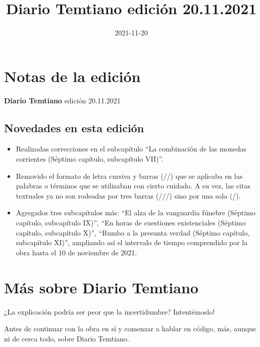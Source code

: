 \documentclass[
  spanish,
]{book}
\title{Diario Temtiano edición 20.11.2021}
\author{}
\date{\vspace{-2.5em}2021-11-20}
\begin{document}
\maketitle

{
\setcounter{tocdepth}{1}
\tableofcontents
}
\hypertarget{notas-de-la-ediciuxf3n}{%
\chapter*{Notas de la edición}\label{notas-de-la-ediciuxf3n}}

\textbf{Diario Temtiano} edición 20.11.2021

\hypertarget{novedades-en-esta-ediciuxf3n}{%
\section*{Novedades en esta edición}\label{novedades-en-esta-ediciuxf3n}}

\begin{itemize}
\item
  Realizadas correcciones en el subcapítulo ``La combinación de las monedas corrientes (Séptimo capítulo, subcapítulo VII)''.
\item
  Removido el formato de letra cursiva y barras (//) que se aplicaba en las palabras o términos que se utilizaban con cierto cuidado. A su vez, las citas textuales ya no son rodeadas por tres barras (///) sino por una sola (/).
\item
  Agregados tres subcapítulos más: ``El alza de la vanguardia fúnebre (Séptimo capítulo, subcapítulo IX)'', ``En horas de cuestiones existenciales (Séptimo capítulo, subcapítulo X)'', ``Rumbo a la presunta verdad (Séptimo capítulo, subcapítulo XI)'', ampliando así el intervalo de tiempo comprendido por la obra hasta el 10 de noviembre de 2021.
\end{itemize}

\hypertarget{muxe1s-sobre-diario-temtiano}{%
\chapter*{Más sobre Diario Temtiano}\label{muxe1s-sobre-diario-temtiano}}

¿La explicación podría ser peor que la incertidumbre? Intentémoslo!

Antes de continuar con la obra en sí y comenzar a hablar en código, más, aunque ni de cerca todo, sobre Diario Temtiano.
\end{document}
